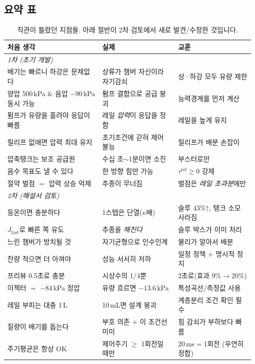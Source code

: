 \documentclass[11pt]{article}
\begin{document}
\subsection{요약 표}

\begin{table}[h]
\centering\small
\begin{tabular}{p{4.0cm}p{5.0cm}p{5.2cm}}
\toprule
\textbf{처음 생각} & \textbf{실제} & \textbf{교훈} \\
\midrule
\multicolumn{3}{l}{\textit{1차 (초기 개발)}}\\
배기는 빠르니 하강은 문제없다 & 상류가 챔버 자신이라 자기감쇠 & 상·하강 모두 유량 제한 \\
양압 500\,kPa \& 음압 $-90$\,kPa 동시 가능 & 펌프 결합으로 공급 붕괴 & 능력경계를 먼저 계산 \\
펌프가 유량을 흘려야 응답이 빠름 & 레일 \emph{압력}이 응답을 정함 & 레일을 높게 유지 \\
릴리프 없애면 압력 최대 유지 & 초기조건에 갇혀 제어 불능 & 릴리프가 배분 손잡이 \\
압축탱크는 보조 공급원 & 수십 초$\sim$1분이면 소진 & 부스터로만 \\
음수 목표도 낼 수 있다 & 한 방향 힘만 가능 & $\tau^{\mathrm{ref}}\ge0$ 강제 \\
절약 벌점 $=$ 압력 상승 억제 & 추종이 무너짐 & 벌점은 \emph{레일 초과분}에만 \\
\midrule
\multicolumn{3}{l}{\textit{2차 (해설서 검토)}}\\
등온이면 충분하다 & 1스텝은 단열($\kappa$배) & 슬루 43\%↑, 탱크 소모 사라짐 \\
$J_{\mathrm{fast}}$로 빠른 쪽 유도 & 추종을 \emph{해친다} & 슬루 박스가 이미 처리 \\
느린 챔버가 방치될 것 & 자기균형으로 인수인계 & 물리가 알아서 배분 \\
잔량 적으면 더 아껴야 & 성능 서서히 저하 & 일정 정책 $+$ 명시적 정지 \\
프리뷰 0.5초로 충분 & 시상수의 1/4뿐 & 2초로(효과 $9\%\to20\%$) \\
이젝터 $=$ $-84$\,kPa 정압 & 유량 흐르면 $-13.6$\,kPa & 특성곡선/측정값 사용 \\
레일 부피는 대충 1\,L & 10\,mL면 설계 붕괴 & 계층분리 조건 확인 필수 \\
질량이 배기를 돕는다 & 부호 의존 $+$ 이 조건선 미미 & 힘 감쇠가 부하보다 빠름 \\
주기평균은 항상 OK & 제어주기 $\ge$ 1회전일 때만 & 20\,ms$=$1회전 (우연히 정합) \\
\bottomrule
\end{tabular}
\caption{직관이 틀렸던 지점들. 아래 절반이 2차 검토에서 새로 발견/수정한 것입니다.}
\end{table}
\end{document}
